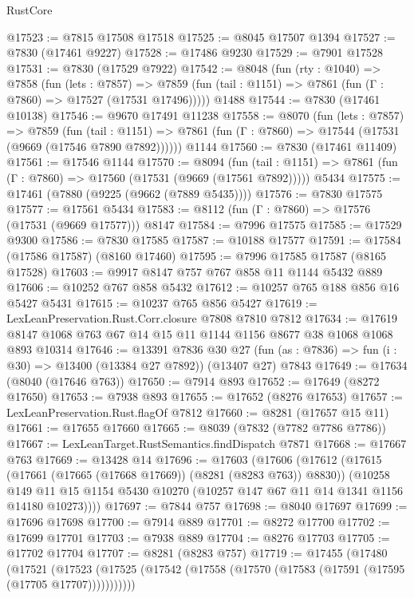 \begin{lexlean}{RustCore}
\begin{coremodule}
@17523 := @7815 @17508 @17518
@17525 := @8045 @17507 @1394
@17527 := @7830 (@17461 @9227)
@17528 := @17486 @9230
@17529 := @7901 @17528
@17531 := @7830 (@17529 @7922)
@17542 := @8048
    (fun (rty : @1040) =>
    @7858
      (fun (lets : @7857) =>
      @7859 (fun (tail : @1151) => @7861 (fun (Γ : @7860) => @17527 (@17531 @17496)))))
    @1488
@17544 := @7830 (@17461 @10138)
@17546 := @9670 @17491 @11238
@17558 := @8070
    (fun (lets : @7857) =>
    @7859
      (fun (tail : @1151) =>
      @7861 (fun (Γ : @7860) => @17544 (@17531 (@9669 (@17546 @7890 @7892))))))
    @1144
@17560 := @7830 (@17461 @11409)
@17561 := @17546 @1144
@17570 := @8094
    (fun (tail : @1151) => @7861 (fun (Γ : @7860) => @17560 (@17531 (@9669 (@17561 @7892)))))
    @5434
@17575 := @17461 (@7880 (@9225 (@9662 (@7889 @5435))))
@17576 := @7830 @17575
@17577 := @17561 @5434
@17583 := @8112 (fun (Γ : @7860) => @17576 (@17531 (@9669 @17577))) @8147
@17584 := @7996 @17575
@17585 := @17529 @9300
@17586 := @7830 @17585
@17587 := @10188 @17577
@17591 := @17584 (@17586 @17587) (@8160 @17460)
@17595 := @7996 @17585 @17587 (@8165 @17528)
@17603 := @9917 @8147 @757 @767 @858 @11 @1144 @5432 @889
@17606 := @10252 @767 @858 @5432
@17612 := @10257 @765 @188 @856 @16 @5427 @5431
@17615 := @10237 @765 @856 @5427
@17619 := LexLeanPreservation.Rust.Corr.closure @7808 @7810 @7812
@17634 := @17619 @8147 @1068 @763 @67 @14 @15 @11 @1144 @1156 @8677 @38 @1068 @1068 @893 @10314
@17646 := @13391
    @7836
    @30
    @27
    (fun (as : @7836) => fun (i : @30) => @13400 (@13384 @27 @7892))
    (@13407 @27)
    @7843
@17649 := @17634 (@8040 (@17646 @763))
@17650 := @7914 @893
@17652 := @17649 (@8272 @17650)
@17653 := @7938 @893
@17655 := @17652 (@8276 @17653)
@17657 := LexLeanPreservation.Rust.flagOf @7812
@17660 := @8281 (@17657 @15 @11)
@17661 := @17655 @17660
@17665 := @8039 (@7832 (@7782 @7786 @7786))
@17667 := LexLeanTarget.RustSemantics.findDispatch @7871
@17668 := @17667 @763
@17669 := @13428 @14
@17696 := @17603
    (@17606
      (@17612
        (@17615 (@17661 (@17665 (@17668 @17669)) (@8281 (@8283 @763)) @8830))
        (@10258
          @149
          @11
          @15
          @1154
          @5430
          @10270
          (@10257 @147 @67 @11 @14 @1341 @1156 @14180 @10273))))
@17697 := @7844 @757
@17698 := @8040 @17697
@17699 := @17696 @17698
@17700 := @7914 @889
@17701 := @8272 @17700
@17702 := @17699 @17701
@17703 := @7938 @889
@17704 := @8276 @17703
@17705 := @17702 @17704
@17707 := @8281 (@8283 @757)
@17719 := @17455
    (@17480
      (@17521
        (@17523 (@17525 (@17542 (@17558 (@17570 (@17583 (@17591 (@17595 (@17705 @17707)))))))))))

\end{coremodule}
\end{lexlean}
